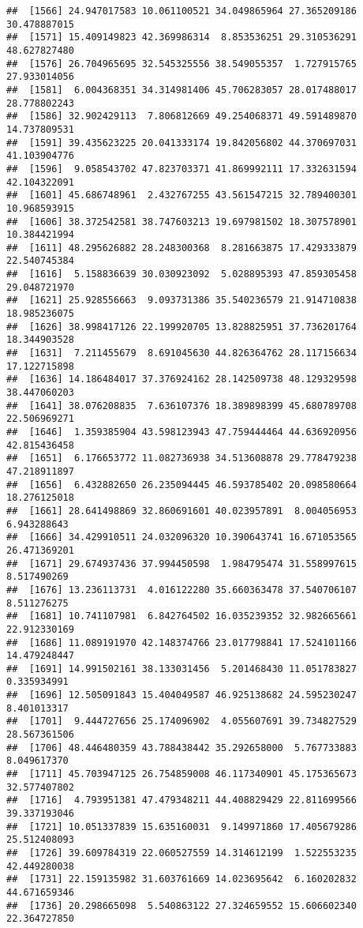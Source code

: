 \documentclass[
]{article}
\begin{document}
\begin{verbatim}
##  [1566] 24.947017583 10.061100521 34.049865964 27.365209186 30.478887015
##  [1571] 15.409149823 42.369986314  8.853536251 29.310536291 48.627827480
##  [1576] 26.704965695 32.545325556 38.549055357  1.727915765 27.933014056
##  [1581]  6.004368351 34.314981406 45.706283057 28.017488017 28.778802243
##  [1586] 32.902429113  7.806812669 49.254068371 49.591489870 14.737809531
##  [1591] 39.435623225 20.041333174 19.842056802 44.370697031 41.103904776
##  [1596]  9.058543702 47.823703371 41.869992111 17.332631594 42.104322091
##  [1601] 45.686748961  2.432767255 43.561547215 32.789400301 10.968593915
##  [1606] 38.372542581 38.747603213 19.697981502 18.307578901 10.384421994
##  [1611] 48.295626882 28.248300368  8.281663875 17.429333879 22.540745384
##  [1616]  5.158836639 30.030923092  5.028895393 47.859305458 29.048721970
##  [1621] 25.928556663  9.093731386 35.540236579 21.914710838 18.985236075
##  [1626] 38.998417126 22.199920705 13.828825951 37.736201764 18.344903528
##  [1631]  7.211455679  8.691045630 44.826364762 28.117156634 17.122715898
##  [1636] 14.186484017 37.376924162 28.142509738 48.129329598 38.447060203
##  [1641] 38.076208835  7.636107376 18.389898399 45.680789708 22.506969271
##  [1646]  1.359385904 43.598123943 47.759444464 44.636920956 42.815436458
##  [1651]  6.176653772 11.082736938 34.513608878 29.778479238 47.218911897
##  [1656]  6.432882650 26.235094445 46.593785402 20.098580664 18.276125018
##  [1661] 28.641498869 32.860691601 40.023957891  8.004056953  6.943288643
##  [1666] 34.429910511 24.032096320 10.390643741 16.671053565 26.471369201
##  [1671] 29.674937436 37.994450598  1.984795474 31.558997615  8.517490269
##  [1676] 13.236113731  4.016122280 35.660363478 37.540706107  8.511276275
##  [1681] 10.741107981  6.842764502 16.035239352 32.982665661 22.912330169
##  [1686] 11.089191970 42.148374766 23.017798841 17.524101166 14.479248447
##  [1691] 14.991502161 38.133031456  5.201468430 11.051783827  0.335934991
##  [1696] 12.505091843 15.404049587 46.925138682 24.595230247  8.401013317
##  [1701]  9.444727656 25.174096902  4.055607691 39.734827529 28.567361506
##  [1706] 48.446480359 43.788438442 35.292658000  5.767733883  8.049617370
##  [1711] 45.703947125 26.754859008 46.117340901 45.175365673 32.577407802
##  [1716]  4.793951381 47.479348211 44.408829429 22.811699566 39.337193046
##  [1721] 10.051337839 15.635160031  9.149971860 17.405679286 25.512408093
##  [1726] 39.609784319 22.060527559 14.314612199  1.522553235 42.449280038
##  [1731] 22.159135982 31.603761669 14.023695642  6.160202832 44.671659346
##  [1736] 20.298665098  5.540863122 27.324659552 15.606602340 22.364727850

\end{verbatim}
\end{document}
